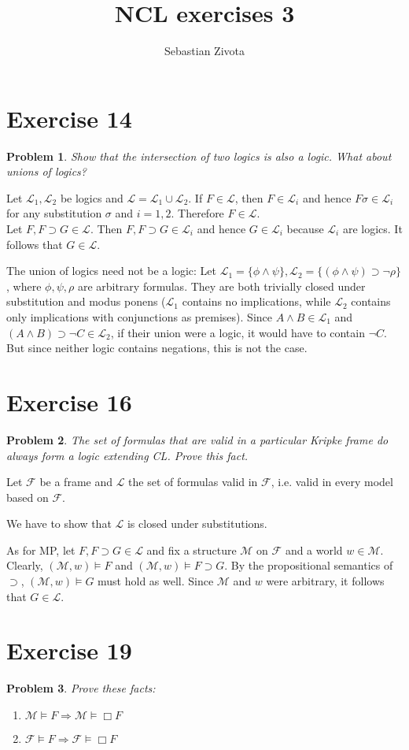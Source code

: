 \documentclass[a4paper,10pt]{article}
\title{NCL exercises 3}
\author{Sebastian Zivota}
\newcommand{\imp}{\supset}
\newcommand{\F}{\mathcal{F}}
\renewcommand{\L}{\mathcal{L}}
\newcommand{\M}{\mathcal{M}}
\newtheorem*{problem*}{Problem}
\theoremstyle{definition}
\begin{document}
\maketitle

\section*{Exercise 14}

\begin{problem*}
Show that the intersection of two logics is also a logic.
What about unions of logics?

\end{problem*}
Let $\L_1, \L_2$ be logics and $\L = \L_1 ∪ \L_2$. If $F \in \L$, then $F \in \L_i$ and hence $Fσ \in \L_i$ for any substitution $σ$ and $i = 1,2$. Therefore $F \in \L$.\\
Let $F, F \imp G \in \L$. Then $F, F \imp G \in \L_i$ and hence $G \in \L_i$ because $\L_i$ are logics. It follows that $G \in \L$.

The union of logics need not be a logic: Let $\L_1 = \{ϕ ∧ ψ \}, \L_2 = \{(ϕ ∧ ψ) \imp ¬ρ \}$, where $ϕ, ψ, ρ$ are arbitrary formulas. They are both trivially closed under substitution and modus ponens ($\L_1$ contains no implications, while $\L_2$ contains only implications with conjunctions as premises). Since $A ∧ B \in \L_1$ and $(A ∧ B) \imp ¬ C \in \L_2$, if their union were a logic, it would have to contain $¬C$. But since neither logic contains negations, this is not the case.
\section*{Exercise 16}
\begin{problem*}
The set of formulas that are valid in a particular Kripke frame do always form a logic extending CL. Prove this fact.
\end{problem*}
Let $\F$ be a frame and $\L$ the set of formulas valid in $\F$, i.e. valid in every model based on $\F$.

We have to show that $\L$ is closed under substitutions. 

As for MP, let $F, F \imp G \in \L$ and fix a structure $\M$ on $\F$ and a world $w \in \M$. Clearly, $(\M, w) \models F$ and $(\M, w) \models F \imp G$. By the propositional semantics of $\imp$, $(\M, w) \models G$ must hold as well. Since $\M$ and $w$ were arbitrary, it follows that $G \in \L$.

\section{Exercise 19}
\begin{problem*}
 Prove these facts:
 \begin{enumerate}
  \item $\M \models F \Rightarrow \M \models \Box F$
  \item $\F \models F \Rightarrow \F \models \Box F$
 \end{enumerate}
\end{problem*}
\end{document}
